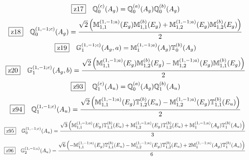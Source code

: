 \documentclass[fleqn,10pt,landscape]{jsarticle}
\begin{document}
\begin{dmath*}
\hspace*{3mm}\fbox{z17}\quad \mathbb{Q}_{0}^{(c)}(A_{g})=\mathbb{Q}_{0}^{(a)}(A_{g}) \mathbb{Q}_{0}^{(b)}(A_{g})
\end{dmath*}
\begin{dmath*}
\hspace*{3mm}\fbox{z18}\quad \mathbb{Q}_{0}^{(1,-1;c)}(A_{g})=\frac{\sqrt{2} \left(\mathbb{M}_{1,1}^{(1,-1;a)}(E_{g}) \mathbb{M}_{1,1}^{(b)}(E_{g}) + \mathbb{M}_{1,2}^{(1,-1;a)}(E_{g}) \mathbb{M}_{1,2}^{(b)}(E_{g})\right)}{2}
\end{dmath*}
\begin{dmath*}
\hspace*{3mm}\fbox{z19}\quad \mathbb{G}_{1}^{(1,-1;c)}(A_{g},a)=\mathbb{M}_{1}^{(1,-1;a)}(A_{g}) \mathbb{T}_{0}^{(b)}(A_{g})
\end{dmath*}
\begin{dmath*}
\hspace*{3mm}\fbox{z20}\quad \mathbb{G}_{1}^{(1,-1;c)}(A_{g},b)=\frac{\sqrt{2} \left(\mathbb{M}_{1,1}^{(1,-1;a)}(E_{g}) \mathbb{M}_{1,2}^{(b)}(E_{g}) - \mathbb{M}_{1,2}^{(1,-1;a)}(E_{g}) \mathbb{M}_{1,1}^{(b)}(E_{g})\right)}{2}
\end{dmath*}
\begin{dmath*}
\hspace*{3mm}\fbox{z93}\quad \mathbb{Q}_{1}^{(c)}(A_{u})=\mathbb{Q}_{0}^{(a)}(A_{g}) \mathbb{Q}_{1}^{(b)}(A_{u})
\end{dmath*}
\begin{dmath*}
\hspace*{3mm}\fbox{z94}\quad \mathbb{Q}_{1}^{(1,-1;c)}(A_{u})=\frac{\sqrt{2} \left(\mathbb{M}_{1,1}^{(1,-1;a)}(E_{g}) \mathbb{T}_{1,2}^{(b)}(E_{u}) - \mathbb{M}_{1,2}^{(1,-1;a)}(E_{g}) \mathbb{T}_{1,1}^{(b)}(E_{u})\right)}{2}
\end{dmath*}
\begin{dmath*}
\hspace*{3mm}\fbox{z95}\quad \mathbb{G}_{0}^{(1,-1;c)}(A_{u})=\frac{\sqrt{3} \left(\mathbb{M}_{1,1}^{(1,-1;a)}(E_{g}) \mathbb{T}_{1,1}^{(b)}(E_{u}) + \mathbb{M}_{1,2}^{(1,-1;a)}(E_{g}) \mathbb{T}_{1,2}^{(b)}(E_{u}) + \mathbb{M}_{1}^{(1,-1;a)}(A_{g}) \mathbb{T}_{1}^{(b)}(A_{u})\right)}{3}
\end{dmath*}
\begin{dmath*}
\hspace*{3mm}\fbox{z96}\quad \mathbb{G}_{2}^{(1,-1;c)}(A_{u})=\frac{\sqrt{6} \left(- \mathbb{M}_{1,1}^{(1,-1;a)}(E_{g}) \mathbb{T}_{1,1}^{(b)}(E_{u}) - \mathbb{M}_{1,2}^{(1,-1;a)}(E_{g}) \mathbb{T}_{1,2}^{(b)}(E_{u}) + 2 \mathbb{M}_{1}^{(1,-1;a)}(A_{g}) \mathbb{T}_{1}^{(b)}(A_{u})\right)}{6}
\end{dmath*}
\end{document}
